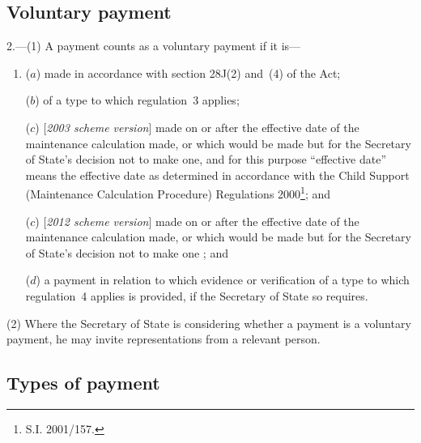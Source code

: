 \documentclass[12pt,a4paper]{article}
\begin{document}
\subsection[2. Voluntary payment]{Voluntary payment}

2.---(1)  A payment counts as a voluntary payment if it is—
\begin{enumerate}\item[]
($a$) made in accordance with section 28J(2) and~(4) of the Act;

($b$) of a type to which regulation~3 applies;

($c$) [\emph{2003 scheme version}] made on or after the effective date of the maintenance calculation made, or which would be made but for the Secretary of State’s decision not to make one, and for this purpose “effective date” means the effective date as determined in accordance with the Child Support (Maintenance Calculation Procedure) Regulations 2000\footnote{\frenchspacing S.I. 2001/157.}; and

($c$) [\emph{2012 scheme version}] made on or after the effective date of the maintenance calculation made, or which would be made but for the Secretary of State’s decision not to make one%
; and

($d$) a payment in relation to which evidence or verification of a type to which regulation~4 applies is provided, if the Secretary of State so requires.
\end{enumerate}

(2) Where the Secretary of State is considering whether a payment is a voluntary payment, he may invite representations from a relevant person.


\subsection[3. Types of payment]{Types of payment}
\end{document}
